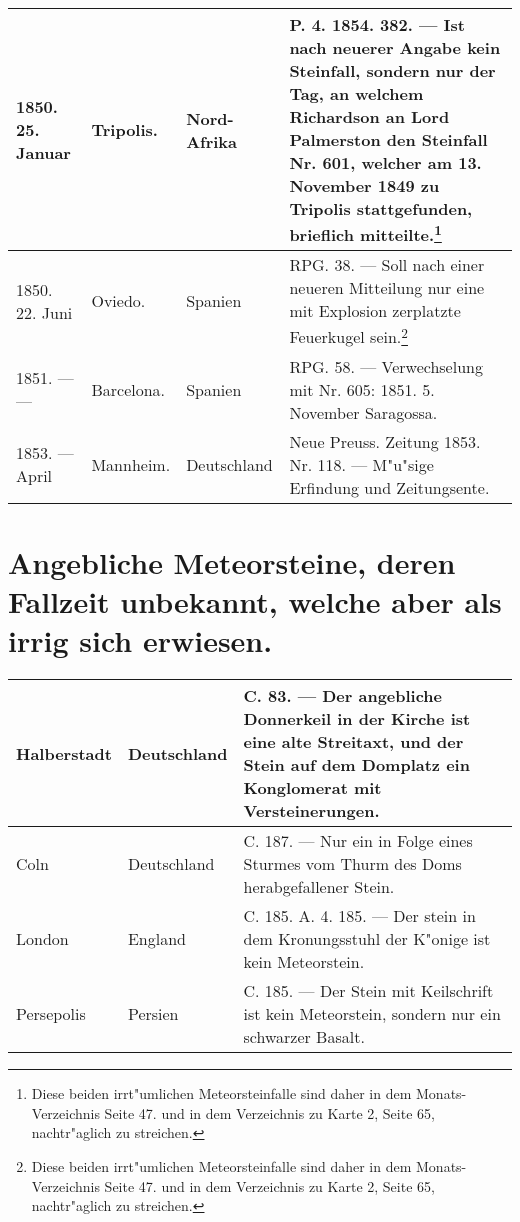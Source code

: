 \documentclass[a4paper, 8pt, oneside, polutonikogreek, german]{article}
\begin{document}
\begin{center}
\begin{longtable}{| p{20mm} | p{25mm} | p{16mm} | p{50mm} |}
        1850. 25. Januar & Tripolis. & Nord-Afrika & P. 4. 1854. 382. --- Ist nach neuerer Angabe kein Steinfall, sondern nur der Tag, an welchem Richardson an Lord Palmerston den Steinfall Nr. 601, welcher am 13. November 1849 zu Tripolis stattgefunden, brieflich mitteilte.\footnote{Diese beiden irrt"umlichen Meteorsteinfalle sind daher in dem Monats-Verzeichnis Seite 47. und in dem Verzeichnis zu Karte 2, Seite 65, nachtr"aglich zu streichen.} \\ \hline
        1850. 22. Juni & Oviedo. & Spanien & RPG. 38. --- Soll nach einer neueren Mitteilung nur eine mit Explosion zerplatzte Feuerkugel sein.\footnote{Diese beiden irrt"umlichen Meteorsteinfalle sind daher in dem Monats-Verzeichnis Seite 47. und in dem Verzeichnis zu Karte 2, Seite 65, nachtr"aglich zu streichen.} \\ \hline
        1851. --- --- & Barcelona. & Spanien & RPG. 58. --- Verwechselung mit Nr. 605: 1851. 5. November Saragossa. \\ \hline
        1853. --- April & Mannheim. & Deutschland & Neue Preuss. Zeitung 1853. Nr. 118. --- M"u"sige Erfindung und Zeitungsente. \\ \hline
    \end{longtable}
\end{center}
\clearpage
\section{Angebliche Meteorsteine, deren Fallzeit unbekannt, welche aber als irrig sich erwiesen.}
\begin{table}[H]
    \centering
    \footnotesize
    \begin{longtable}{|l|l|p{45mm}|}
    \hline
        Halberstadt & Deutschland & C. 83. --- Der angebliche Donnerkeil in der Kirche ist eine alte Streitaxt, und der Stein auf dem Domplatz ein Konglomerat mit Versteinerungen. \\ \hline
        Coln & Deutschland & C. 187. --- Nur ein in Folge eines Sturmes vom Thurm des Doms herabgefallener Stein. \\ \hline
        London & England & C. 185. A. 4. 185. --- Der stein in dem Kronungsstuhl der K"onige ist kein Meteorstein. \\ \hline
        Persepolis & Persien & C. 185. --- Der Stein mit Keilschrift ist kein Meteorstein, sondern nur ein schwarzer Basalt. \\ \hline
    \end{longtable}
\end{table}
\clearpage
\end{document}
